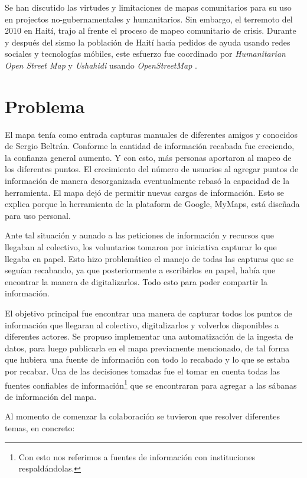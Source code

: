 \documentclass[12pt,spanish,oneside,breaklinks]{book}
\begin{document}
Se han discutido las virtudes y limitaciones de mapas comunitarios para su uso en projectos no-gubernamentales y humanitarios. Sin embargo, el terremoto del 2010 en Haití,  trajo al frente el proceso de mapeo comunitario de crisis. Durante y después del sismo la población de Haití hacía pedidos de ayuda usando redes sociales y tecnologías móbiles, este esfuerzo fue coordinado por \textit{Humanitarian Open Street Map} y \textit{Ushahidi} usando \textit{OpenStreetMap} \cite{crowdsourced}.

\newpage
\chapter{Problema}
\label{sec:org7ca56db}

El mapa tenía como entrada capturas manuales de diferentes amigos y conocidos de Sergio Beltrán.  Conforme la cantidad de información recabada fue creciendo, la confianza general aumento. Y con esto, más personas aportaron al mapeo de los diferentes puntos. El crecimiento del número de usuarios al agregar puntos de información de manera desorganizada eventualmente rebasó la capacidad de la herramienta. El mapa dejó de permitir nuevas cargas de información. Esto se explica porque la herramienta de la plataform de Google,  MyMaps, está diseñada para uso personal.

Ante tal situación y aunado a las peticiones de información y recursos que llegaban al colectivo, los voluntarios tomaron por iniciativa capturar lo que llegaba en papel. Esto hizo problemático el manejo de todas las capturas que se seguían recabando, ya que posteriormente a escribirlos en papel, había que encontrar la manera de digitalizarlos. Todo esto para poder compartir la información. 

El objetivo principal fue encontrar una manera de capturar todos los puntos de información que llegaran al colectivo, digitalizarlos y volverlos disponibles a diferentes actores. Se propuso implementar una automatización de la ingesta de datos, para luego publicarla en el mapa previamente mencionado, de tal forma que hubiera una fuente de información con todo lo recabado y lo que se estaba por recabar. Una de las decisiones tomadas fue el  tomar en cuenta todas las fuentes confiables de información\footnote{Con esto nos referimos a fuentes de información con instituciones respaldándolas.} que se encontraran para agregar a las sábanas de información del mapa.

Al momento de comenzar la colaboración se tuvieron que resolver diferentes temas, en concreto:
\end{document}
